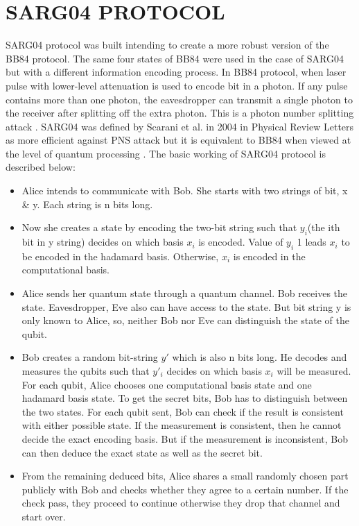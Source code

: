 \documentclass[superscriptaddress,twocolumn,showpacs,prb,floatfix]{revtex4}
\begin{document}
\section{SARG04 PROTOCOL}
\label{SecIII}
SARG04 protocol was built intending to create a more robust version of the BB84 protocol. The same four states of BB84 were used in the case of SARG04 but with a different information encoding process. In BB84 protocol, when laser pulse with lower-level attenuation is used to encode bit in a photon. If any pulse contains more than one photon, the eavesdropper can transmit a single photon to the receiver after splitting off the extra photon. This is a photon number splitting attack \cite{2000PhRvL..85.1330B}. SARG04 was defined by Scarani et al. in 2004 in Physical Review Letters as more efficient against PNS attack but it is equivalent to BB84 when viewed at the level of quantum processing \cite{2004PhRvL..92e7901S}.
The basic working of SARG04 protocol is described below:
\begin{itemize}
    \item \raggedright Alice intends to communicate with Bob. She starts with two strings of bit, x \& y. Each string is n bits long.
    \item Now she creates a state by encoding the two-bit string such that $y_i$(the ith bit in y string) decides on which basis $x_i$ is encoded. Value of $y_i$ 1 leads $x_i$ to be encoded in the hadamard basis. Otherwise, $x_i$ is encoded in the computational basis. 
    \item Alice sends her quantum state through a quantum channel. Bob receives the state. Eavesdropper, Eve also can have access to the state. But bit string y is only known to Alice, so, neither Bob nor Eve can distinguish the state of the qubit. 
    \item Bob creates a random bit-string $y'$ which is also n bits long. He decodes and measures the qubits such that $y'_i$ decides on which basis $x_i$ will be measured. For each qubit, Alice chooses one computational basis state and one hadamard basis state. To get the secret bits, Bob has to distinguish between the two states. For each qubit sent, Bob can check if the result is consistent with either possible state. If the measurement is consistent, then he cannot decide the exact encoding basis. But if the measurement is inconsistent, Bob can then deduce the exact state as well as the secret bit.\label{Process}
 
    \item From the remaining deduced bits, Alice shares a small randomly chosen part publicly with Bob and checks whether they agree to a certain number. If the check pass, they proceed to continue otherwise they drop that channel and start over. 
\end{itemize}
\end{document}
